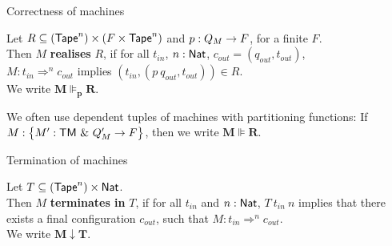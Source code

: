\begin{frame}{Correctness of machines}
  \begin{definition}
    Let $R \subseteq (\textsf{Tape}^n) \times (F \times \textsf{Tape}^n)$ and $p : Q_M \rightarrow F$, for a finite $F$.\\
    Then $M$ \textbf{realises} $R$, if for all $t_{in}$, $n:\textsf{Nat}$, $c_{out} = (q_{out}, t_{out})$,\\
    $M: t_{in} \Rightarrow^n c_{out}$ implies $\left(t_{in}, \left(p~q_{out}, t_{out} \right) \right) \in R$.\\
    We write $\mathbf{M \VDash_p R}$.
  \end{definition}
  We often use dependent tuples of machines with partitioning functions:
  If $M : \bigl\{ M' : \textsf{TM}~{\&}~Q_M' \rightarrow F \bigr \}$, then we write $\mathbf{M \VDash R}$.
\end{frame}

\begin{frame}{Termination of machines}
  \begin{definition}
    Let $T \subseteq (\textsf{Tape}^n) \times \textsf{Nat}$.\\
    Then $M$ \textbf{terminates in} $T$, if for all $t_{in}$ and $n:\textsf{Nat}$, $T~t_{in}~n$ implies
    that there exists a final configuration $c_{out}$, such that $M: t_{in} \Rightarrow^n c_{out}$.\\
    We write $\mathbf{M \downarrow T}$.
  \end{definition}
\end{frame}

